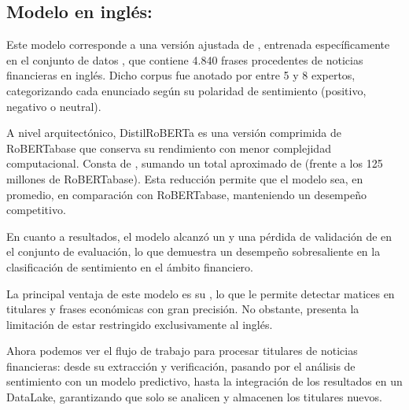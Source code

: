 \documentclass[letterpaper,10pt,spanish]{sphinxmanual}
\begin{document}
\subsection{Modelo en inglés: }
\label{\detokenize{AutomatizacionFinanciera:modelo-en-ingles-mrm8488-distilroberta-finetuned-financial-news-sentiment-analysis}}
\sphinxAtStartPar
Este modelo corresponde a una versión ajustada de , entrenada específicamente en el conjunto de datos , que contiene 4.840 frases procedentes de noticias financieras en inglés. Dicho corpus fue anotado por entre 5 y 8 expertos, categorizando cada enunciado según su polaridad de sentimiento (positivo, negativo o neutral).

\sphinxAtStartPar
A nivel arquitectónico, DistilRoBERTa es una versión comprimida de RoBERTa\sphinxhyphen{}base que conserva su rendimiento con menor complejidad computacional. Consta de , sumando un total aproximado de  (frente a los 125 millones de RoBERTa\sphinxhyphen{}base). Esta reducción permite que el modelo sea, en promedio,  en comparación con RoBERTa\sphinxhyphen{}base, manteniendo un desempeño competitivo.

\sphinxAtStartPar
En cuanto a resultados, el modelo alcanzó un  y una pérdida de validación de  en el conjunto de evaluación, lo que demuestra un desempeño sobresaliente en la clasificación de sentimiento en el ámbito financiero.

\sphinxAtStartPar
La principal ventaja de este modelo es su , lo que le permite detectar matices en titulares y frases económicas con gran precisión. No obstante, presenta la limitación de estar restringido exclusivamente al inglés.

\sphinxAtStartPar
{}

\sphinxAtStartPar
Ahora podemos ver el flujo de trabajo para procesar titulares de noticias financieras: desde su extracción y verificación, pasando por el análisis de sentimiento con un modelo predictivo, hasta la integración de los resultados en un DataLake, garantizando que solo se analicen y almacenen los titulares nuevos.
\end{document}
